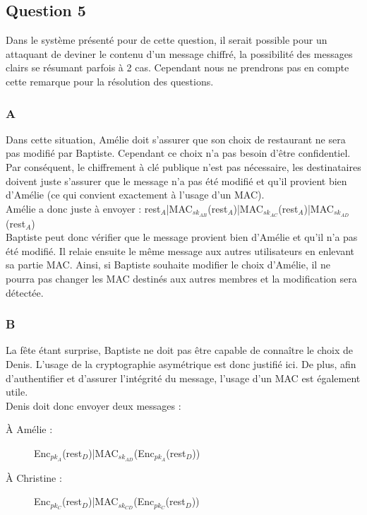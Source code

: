 \documentclass[a4paper, 11pt, oneside]{article}
\begin{document}
\subsection{Question 5}

Dans le système présenté pour de cette question, il serait possible pour un attaquant de deviner le contenu d'un message chiffré, la possibilité des messages clairs se résumant parfois à 2 cas. Cependant nous ne prendrons pas en compte cette remarque pour la résolution des questions.

\subsubsection{A}

Dans cette situation, Amélie doit s'assurer que son choix de restaurant ne sera pas modifié par Baptiste. Cependant ce choix n'a pas besoin d'être confidentiel.
Par conséquent, le chiffrement à clé publique n'est pas nécessaire, les destinataires doivent juste s'assurer que le message n'a pas été modifié et qu'il provient bien d'Amélie (ce qui convient exactement à l'usage d'un MAC).\\[5pt]
Amélie a donc juste à envoyer : rest$_{A}$|MAC$_{sk_{AB}}$(rest$_{A}$)|MAC$_{sk_{AC}}$(rest$_{A}$)|MAC$_{sk_{AD}}$(rest$_{A}$)\\[5pt]
Baptiste peut donc vérifier que le message provient bien d'Amélie et qu'il n'a pas été modifié. Il relaie ensuite le même message aux autres utilisateurs en enlevant sa partie MAC.
Ainsi, si Baptiste souhaite modifier le choix d'Amélie, il ne pourra pas changer les MAC destinés aux autres membres et la modification sera détectée.

\subsubsection{B}

La fête étant surprise, Baptiste ne doit pas être capable de connaître le choix de Denis. L'usage de la cryptographie asymétrique est donc justifié ici. De plus, afin d'authentifier et d'assurer l'intégrité du message, l'usage d'un MAC est également utile.\\[5pt]
Denis doit donc envoyer deux messages : 

\begin{description}
 \item[À Amélie : ] Enc$_{pk_{A}}$(rest$_{D}$)|MAC$_{sk_{AD}}$(Enc$_{pk_{A}}$(rest$_{D}$))
 \item[À Christine : ] Enc$_{pk_{C}}$(rest$_{D}$)|MAC$_{sk_{CD}}$(Enc$_{pk_{C}}$(rest$_{D}$))
\end{description}
\vspace{5pt}
\end{document}
